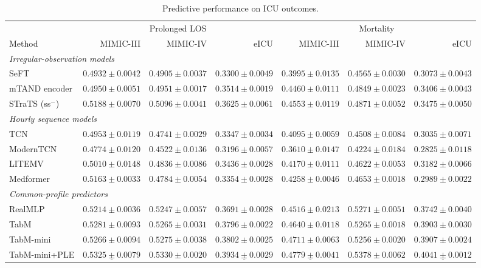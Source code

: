 \begin{table}[tp]
\centering\small
\setlength{\tabcolsep}{1.4pt}
\caption{Predictive performance on ICU outcomes.}
\label{tab:primary}
\begin{tabular}{lrrrrrr}
\toprule
& \multicolumn{3}{c}{Prolonged LOS} & \multicolumn{3}{c}{Mortality} \\
\cmidrule(lr){2-4}\cmidrule(lr){5-7}
Method & MIMIC-III & MIMIC-IV & eICU & MIMIC-III & MIMIC-IV & eICU \\
\midrule
\multicolumn{7}{l}{\textit{Irregular-observation models}} \\
SeFT & $0.4932\pm0.0042$ & $0.4905\pm0.0037$ & $0.3300\pm0.0049$ & $0.3995\pm0.0135$ & $0.4565\pm0.0030$ & $0.3073\pm0.0043$ \\
mTAND encoder & $0.4950\pm0.0051$ & $0.4951\pm0.0017$ & $0.3514\pm0.0019$ & $0.4460\pm0.0111$ & $0.4849\pm0.0023$ & $0.3406\pm0.0043$ \\
STraTS (ss$^{-}$) & $0.5188\pm0.0070$ & $0.5096\pm0.0041$ & $0.3625\pm0.0061$ & $0.4553\pm0.0119$ & $0.4871\pm0.0052$ & $0.3475\pm0.0050$ \\
\midrule
\multicolumn{7}{l}{\textit{Hourly sequence models}} \\
TCN & $0.4953\pm0.0119$ & $0.4741\pm0.0029$ & $0.3347\pm0.0034$ & $0.4095\pm0.0059$ & $0.4508\pm0.0084$ & $0.3035\pm0.0071$ \\
ModernTCN & $0.4774\pm0.0120$ & $0.4522\pm0.0136$ & $0.3196\pm0.0057$ & $0.3610\pm0.0147$ & $0.4224\pm0.0184$ & $0.2825\pm0.0118$ \\
LITEMV & $0.5010\pm0.0148$ & $0.4836\pm0.0086$ & $0.3436\pm0.0028$ & $0.4170\pm0.0111$ & $0.4622\pm0.0053$ & $0.3182\pm0.0066$ \\
Medformer & $0.5163\pm0.0033$ & $0.4784\pm0.0054$ & $0.3354\pm0.0028$ & $0.4258\pm0.0046$ & $0.4653\pm0.0018$ & $0.2989\pm0.0022$ \\
\midrule
\multicolumn{7}{l}{\textit{Common-profile predictors}} \\
RealMLP & $0.5214\pm0.0036$ & $0.5247\pm0.0057$ & $0.3691\pm0.0028$ & $0.4516\pm0.0213$ & $0.5271\pm0.0051$ & $0.3742\pm0.0040$ \\
TabM & $0.5281\pm0.0093$ & $0.5265\pm0.0031$ & $0.3796\pm0.0022$ & $0.4640\pm0.0118$ & $0.5265\pm0.0018$ & $0.3903\pm0.0030$ \\
TabM-mini & $0.5266\pm0.0094$ & $0.5275\pm0.0038$ & $0.3802\pm0.0025$ & $0.4711\pm0.0063$ & $0.5256\pm0.0020$ & $0.3907\pm0.0024$ \\
TabM-mini+PLE & $\underline{0.5325\pm0.0079}$ & $0.5330\pm0.0020$ & $\underline{0.3934\pm0.0029}$ & $\underline{0.4779\pm0.0041}$ & $0.5378\pm0.0062$ & $\underline{0.4041\pm0.0012}$ \\

\end{tabular}
\end{table}
